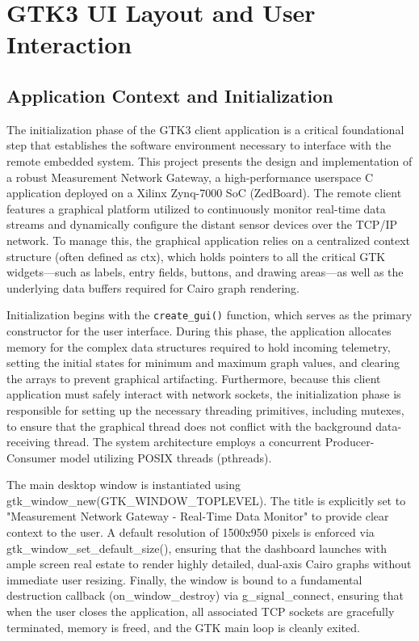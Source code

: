  



\section{GTK3 UI Layout and User Interaction}

\subsection{Application Context and Initialization}
The initialization phase of the GTK3 client application is a critical foundational step that establishes the software environment necessary to interface with the remote embedded system. This project presents the design and implementation of a robust Measurement Network Gateway, a high-performance userspace C application deployed on a Xilinx Zynq-7000 SoC (ZedBoard). The remote client features a graphical platform utilized to continuously monitor real-time data streams and dynamically configure the distant sensor devices over the TCP/IP network. To manage this, the graphical application relies on a centralized context structure (often defined as ctx), which holds pointers to all the critical GTK widgets—such as labels, entry fields, buttons, and drawing areas—as well as the underlying data buffers required for Cairo graph rendering.

Initialization begins with the \texttt{create\_gui()} function, which serves as the primary constructor for the user interface. During this phase, the application allocates memory for the complex data structures required to hold incoming telemetry, setting the initial states for minimum and maximum graph values, and clearing the arrays to prevent graphical artifacting. Furthermore, because this client application must safely interact with network sockets, the initialization phase is responsible for setting up the necessary threading primitives, including mutexes, to ensure that the graphical thread does not conflict with the background data-receiving thread. The system architecture employs a concurrent Producer-Consumer model utilizing POSIX threads (pthreads).

The main desktop window is instantiated using gtk\_window\_new(GTK\_WINDOW\_TOPLEVEL). The title is explicitly set to "Measurement Network Gateway - Real-Time Data Monitor" to provide clear context to the user. A default resolution of 1500x950 pixels is enforced via gtk\_window\_set\_default\_size(), ensuring that the dashboard launches with ample screen real estate to render highly detailed, dual-axis Cairo graphs without immediate user resizing. Finally, the window is bound to a fundamental destruction callback (on\_window\_destroy) via g\_signal\_connect, ensuring that when the user closes the application, all associated TCP sockets are gracefully terminated, memory is freed, and the GTK main loop is cleanly exited.


